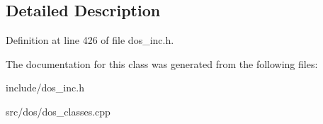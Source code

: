 \subsection{Detailed Description}


Definition at line 426 of file dos\-\_\-inc.\-h.



The documentation for this class was generated from the following files\-:\begin{DoxyCompactItemize}
\item 
include/dos\-\_\-inc.\-h\item 
src/dos/dos\-\_\-classes.\-cpp\end{DoxyCompactItemize}
